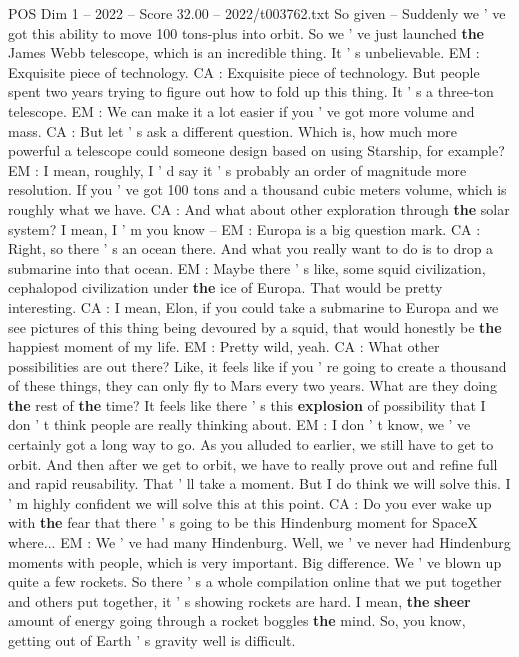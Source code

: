 \begin{textsample}{POS Dim 1 – 2022 – Score 32.00 – 2022/t003762.txt}
So given -- Suddenly we ' ve got this ability to move 100 tons-plus into orbit.
So we ' ve just launched \textbf{the} James Webb telescope, which is an incredible thing.
It ' s unbelievable.
EM : Exquisite piece of technology.
CA : Exquisite piece of technology.
But people spent two years trying to figure out how to fold up this thing.
It ' s a three-ton telescope.
EM : We can make it a lot easier if you ' ve got more volume and mass.
CA : But let ' s ask a different question.
Which is, how much more powerful a telescope could someone design based on using Starship, for example?
EM : I mean, roughly, I ' d say it ' s probably an order of magnitude more resolution.
If you ' ve got 100 tons and a thousand cubic meters volume, which is roughly what we have.
CA : And what about other exploration through \textbf{the} solar system?
I mean, I ' m you know -- EM : Europa is a big question mark.
CA : Right, so there ' s an ocean there.
And what you really want to do is to drop a submarine into that ocean.
EM : Maybe there ' s like, some squid civilization, cephalopod civilization under \textbf{the} ice of Europa.
That would be pretty interesting.
CA : I mean, Elon, if you could take a submarine to Europa and we see pictures of this thing being devoured by a squid, that would honestly be \textbf{the} happiest moment of my life.
EM : Pretty wild, yeah.
CA : What other possibilities are out there?
Like, it feels like if you ' re going to create a thousand of these things, they can only fly to Mars every two years.
What are they doing \textbf{the} rest of \textbf{the} time?
It feels like there ' s this \textbf{explosion} of possibility that I don ' t think people are really thinking about.
EM : I don ' t know, we ' ve certainly got a long way to go.
As you alluded to earlier, we still have to get to orbit.
And then after we get to orbit, we have to really prove out and refine full and rapid reusability.
That ' ll take a moment.
But I do think we will solve this.
I ' m highly confident we will solve this at this point.
CA : Do you ever wake up with \textbf{the} fear that there ' s going to be this Hindenburg moment for SpaceX where...
EM : We ' ve had many Hindenburg.
Well, we ' ve never had Hindenburg moments with people, which is very important.
Big difference.
We ' ve blown up quite a few rockets.
So there ' s a whole compilation online that we put together and others put together, it ' s showing rockets are hard.
I mean, \textbf{the} \textbf{sheer} amount of energy going through a rocket boggles \textbf{the} mind.
So, you know, getting out of Earth ' s gravity well is difficult.

\end{textsample}
